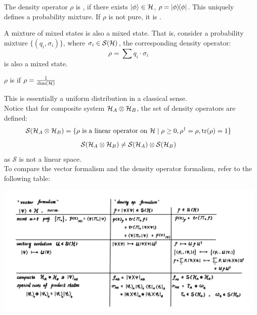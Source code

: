 \begin{definition}
    The density operator $\rho$ is , if there exists $\ket{\phi} \in \mathcal{H}$, $\rho = \dyad{\phi}$. This uniquely defines a probability mixture. If $\rho$ is not pure, it is .
\end{definition}
A mixture of mixed states is also a mixed state. That is, consider a probability mixture $\{(q_i, \sigma_i)\}$, where $\sigma_i \in \mathcal{S}(\mathcal{H})$, the corresponding density operator:
$$\rho = \sum q_i \cdot \sigma_i$$
is also a mixed state. 
\begin{definition}
    $\rho$ is  if $\rho = \frac{\mathbb{I}}{\dim(\mathcal{H})}$
\end{definition}
This is essentially a uniform distribution in a classical sense. \\
Notice that for composite system $\mathcal{H}_A \otimes \mathcal{H}_B$, the set of density operators are defined:
$$\mathcal{S}(\mathcal{H}_A \otimes \mathcal{H}_B) = \{\rho \text{ is a linear operator on }\mathcal{H} \mid \rho \ge 0, \rho^{\dagger} = \rho, \tr(\rho) = 1\}$$
$$\mathcal{S}(\mathcal{H}_A \otimes \mathcal{H}_B) \ne \mathcal{S}(\mathcal{H}_A) \otimes \mathcal{S}(\mathcal{H}_B)$$
as $\mathcal{S}$ is not a linear space. \\
To compare the vector formalism and the density operator formalism, refer to the following table:
\begin{center}
    \includegraphics[scale = 0.625]{vec-rho.png}
\end{center}

